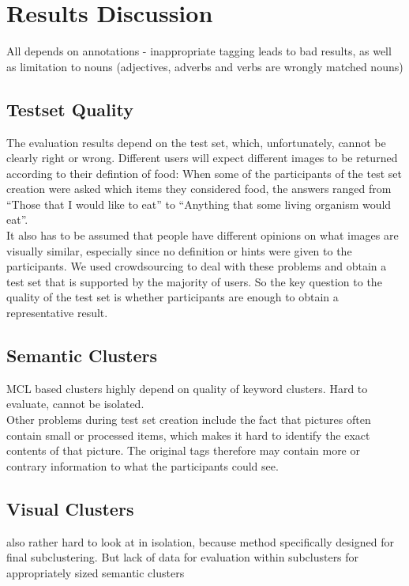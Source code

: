 %
\section{Results Discussion}
\label{sec_discussion}


All depends on annotations - inappropriate tagging leads to bad results, as well as limitation to nouns (adjectives, adverbs and verbs are wrongly matched nouns)

\subsection{Testset Quality}
The evaluation results depend on the test set, which, unfortunately, cannot be clearly right or wrong. Different users will expect different images to be returned according to their defintion of food: When some of the participants of the test set creation were asked which items they considered food, the answers ranged from ``Those that I would like to eat'' to ``Anything that some living organism would eat''. \\
It also has to be assumed that people have different opinions on what images are visually similar, especially since no definition or hints were given to the participants. We used crowdsourcing to deal with these problems and obtain a test set that is supported by the majority of users. So the key question to the quality of the test set is whether  participants are enough to obtain a representative result.

\subsection{Semantic Clusters}
MCL based clusters highly depend on quality of keyword clusters. Hard to evaluate, cannot be isolated.\\
Other problems during test set creation include the fact that pictures often contain small or processed items, which makes it hard to identify the exact contents of that picture. The original tags therefore may contain more or contrary information to what the participants could see. 

\subsection{Visual Clusters}
also rather hard to look at in isolation, because method specifically designed for final subclustering. But lack of data for evaluation within subclusters for appropriately sized semantic clusters